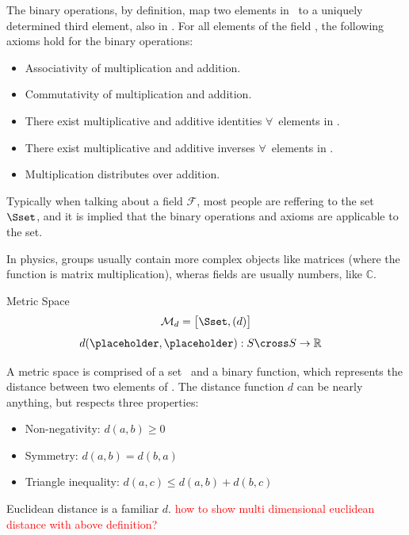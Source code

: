 The binary operations, by definition, map two elements in \Sset\ to a uniquely determined third element, also in \Sset. For all elements of the field \Fset, the following axioms hold for the binary operations:
\begin{itemize}
	\item Associativity of multiplication and addition.
	\item Commutativity of multiplication and addition.
	\item There exist multiplicative and additive identities \(\forall\)\ elements in \Fset.
	\item There exist multiplicative and additive inverses \(\forall\)\ elements in \Fset.
	\item Multiplication distributes over addition.
\end{itemize}

Typically when talking about a field \(\mathcal{F}\), most people are reffering to the set \(\Sset\), and it is implied that the binary operations and axioms are applicable to the set. 

In physics, groups usually contain more complex objects like matrices (where the function is matrix multiplication), wheras fields are usually numbers, like \(\mathbb{C}\). 
\newpage
\begin{mathbox}{Metric Space}
	\begin{equation*}
		\mathcal{M}_d=\big[\Sset, (d)\big]
	\end{equation*}
	\begin{align*}
	d(\placeholder,\placeholder):S\cross S&\rightarrow \mathbb{R}
	\end{align*}
\end{mathbox}
A metric space is comprised of a set \Sset\ and a binary function, which represents the distance between two elements of \Sset. The distance function \(d\) can be nearly anything, but respects three properties:
\begin{itemize}
	\item Non-negativity: \(d(a,b)\geq0\)
	\item Symmetry: \(d(a,b)=d(b,a)\)
	\item Triangle inequality: \(d(a,c)\leq d(a,b)+d(b,c)\)
\end{itemize}
Euclidean distance is a familiar \(d\).
\textcolor{red}{how to show multi dimensional euclidean distance with above definition?}

